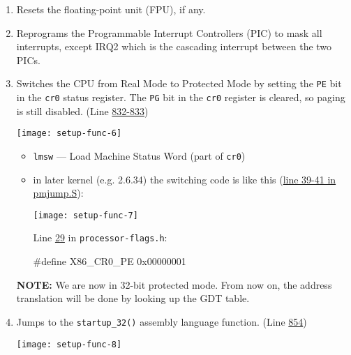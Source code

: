\begin{enumerate}
\begin{itemize}
\begin{itemize}
    \end{itemize}
  \end{itemize}
\item Resets the floating-point unit (FPU), if any.
\item Reprograms the Programmable Interrupt Controllers (PIC) to mask all interrupts,
  except IRQ2 which is the cascading interrupt between the two PICs.
\item Switches the CPU from Real Mode to Protected Mode by setting the \texttt{PE} bit in
  the \texttt{cr0} status register. The \texttt{PG} bit in the \texttt{cr0} register is cleared,
  so paging is still disabled. (Line
  \href{http://lxr.linux.no/linux+v2.6.11/arch/i386/boot/setup.S\#L832}{832-833})

  \begin{center}
    \texttt{[image: setup-func-6]}
  \end{center}

  \begin{itemize}
  \item \texttt{lmsw} --- Load Machine Status Word (part of
    \texttt{cr0}) 
  \item in later kernel (e.g. 2.6.34) the switching code is like this
    (\href{http://lxr.linux.no/linux+v2.6.34/arch/x86/boot/pmjump.S\#L39}{line 39-41 in
      pmjump.S}):
      
    \begin{center}
      \texttt{[image: setup-func-7]}
    \end{center}
      
    Line
    \href{http://lxr.linux.no/linux+v2.6.34/arch/x86/include/asm/processor-flags.h\#L29}{29}
    in \texttt{processor-flags.h}:
    \begin{center}
\begin{ccode}
#define X86_CR0_PE 0x00000001
\end{ccode}    
    \end{center}
  \end{itemize}
  \textbf{NOTE:} We are now in 32-bit protected mode. From now on, the address translation
  will be done by looking up the GDT table.
\item Jumps to the \texttt{startup\_32()} assembly language
  function. (Line \href{http://lxr.linux.no/linux+v2.6.11/arch/i386/boot/setup.S\#L854}{854})
  \begin{center}
    \texttt{[image: setup-func-8]}
  \end{center}


\end{enumerate}
